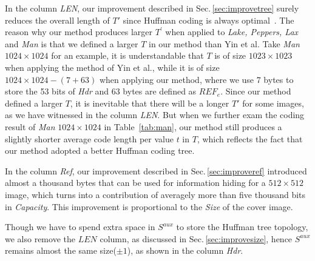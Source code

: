 
In the column \emph{LEN}, our improvement described in Sec.\,\ref{sec:improvetree} surely reduces the overall length of $T'$ since Huffman coding is always optimal~\cite{Long2001}.
%
The reason why our method produces larger $T^\prime$ when applied to \emph{Lake, Peppers, Lax} and \emph{Man} is that we defined a larger $T$ in our method than Yin et al.
%
Take \emph{Man} $1024 \times 1024$ for an example, 
it is understandable that $T$ is of size $1023 \times 1023$ when applying the method of Yin et al., 
while it is of size $1024 \times 1024 - (7 + 63)$ when applying our method, 
where we use 7 bytes to store the 53 bits of \emph{Hdr} and 63 bytes are defined as $REF_e$.
%
Since our method defined a larger $T$, it is inevitable that there will be a longer $T'$ for some images, as we have witnessed in the column \emph{LEN}. 
%
But when we further exam the coding result of \emph{Man} $1024 \times 1024$ in Table~\ref{tab:man}, our method still produces a slightly shorter average code length per value $t$ in $T$, which reflects the fact that our method adopted a better Huffman coding tree.

In the column \emph{Ref}, our improvement described in Sec.\,\ref{sec:improveref} introduced almost a thousand bytes that can be used for information hiding for a $512 \times 512$ image, which turns into a contribution of averagely more than five thousand bits in \emph{Capacity}. 
This improvement is proportional to the \emph{Size} of the cover image.

Though we have to spend extra space in $S^{aux}$ to store the Huffman tree topology, we also remove the $LEN$ column, as discussed in Sec.\,\ref{sec:improvesize}, hence $S^{aux}$ remains almost the same size($\pm 1$), as shown in the column \emph{Hdr}.


